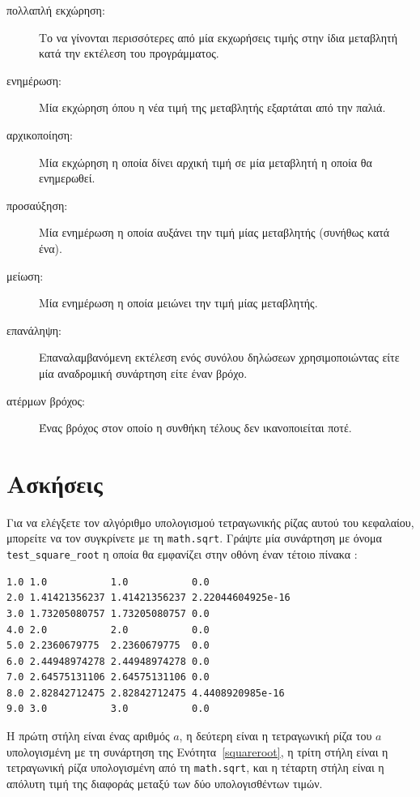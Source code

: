 \documentclass[10pt]{book}
\begin{document}
\begin{description}

\item[πολλαπλή εκχώρηση:] Το να γίνονται περισσότερες από μία εκχωρήσεις τιμής στην ίδια μεταβλητή
κατά την εκτέλεση του προγράμματος.

\item[ενημέρωση:] Μία εκχώρηση όπου η νέα τιμή της μεταβλητής εξαρτάται από την παλιά.

\item[αρχικοποίηση:] Μία εκχώρηση η οποία δίνει αρχική τιμή σε μία μεταβλητή η οποία θα ενημερωθεί.

\item[προσαύξηση:] Μία ενημέρωση η οποία αυξάνει την τιμή μίας μεταβλητής (συνήθως κατά ένα).

\item[μείωση:] Μία ενημέρωση η οποία μειώνει την τιμή μίας μεταβλητής.

\item[επανάληψη:] Επαναλαμβανόμενη εκτέλεση ενός συνόλου δηλώσεων χρησιμοποιώντας είτε μία αναδρομική συνάρτηση είτε έναν βρόχο.

\item[ατέρμων βρόχος:] Ένας βρόχος στον οποίο η συνθήκη τέλους δεν ικανοποιείται ποτέ.

\end{description}


\section{Ασκήσεις}

\begin{exercise}

Για να ελέγξετε τον αλγόριθμο υπολογισμού τετραγωνικής ρίζας αυτού του κεφαλαίου, μπορείτε να τον συγκρίνετε με τη {\tt math.sqrt}. Γράψτε μία συνάρτηση με όνομα \verb"test_square_root" η οποία θα εμφανίζει στην οθόνη έναν τέτοιο πίνακα :

\begin{verbatim}
1.0 1.0           1.0           0.0
2.0 1.41421356237 1.41421356237 2.22044604925e-16
3.0 1.73205080757 1.73205080757 0.0
4.0 2.0           2.0           0.0
5.0 2.2360679775  2.2360679775  0.0
6.0 2.44948974278 2.44948974278 0.0
7.0 2.64575131106 2.64575131106 0.0
8.0 2.82842712475 2.82842712475 4.4408920985e-16
9.0 3.0           3.0           0.0

\end{verbatim}
%

Η πρώτη στήλη είναι ένας αριθμός $a$, η δεύτερη είναι η τετραγωνική
ρίζα του $a$ υπολογισμένη με τη συνάρτηση της Ενότητα~\ref{squareroot}, 
η τρίτη στήλη είναι η τετραγωνική ρίζα υπολογισμένη από τη {\tt math.sqrt},  και η τέταρτη στήλη είναι η απόλυτη τιμή της διαφοράς μεταξύ των δύο υπολογισθέντων τιμών.
\\
\end{exercise}
\end{document}
